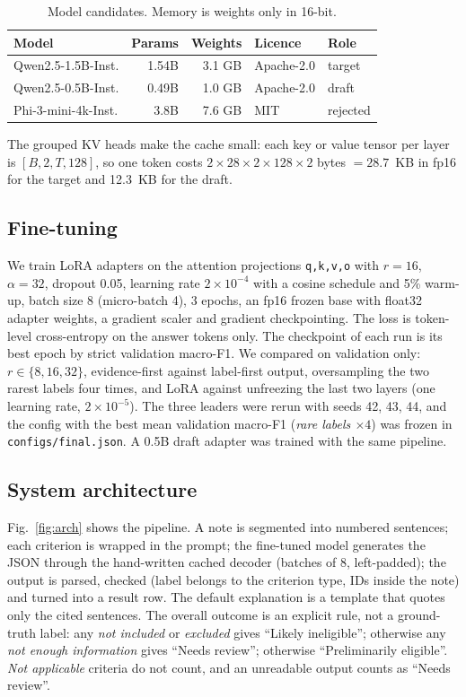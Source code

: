 \documentclass[conference]{IEEEtran}
\begin{document}
\begin{table}[t]
\centering\small
\caption{Model candidates. Memory is weights only in 16-bit.}
\label{tab:models}
\begin{tabular}{lrrll}
\toprule
Model & Params & Weights & Licence & Role \\
\midrule
Qwen2.5-1.5B-Inst. & 1.54B & 3.1 GB & Apache-2.0 & target \\
Qwen2.5-0.5B-Inst. & 0.49B & 1.0 GB & Apache-2.0 & draft \\
Phi-3-mini-4k-Inst. & 3.8B & 7.6 GB & MIT & rejected \\
\bottomrule
\end{tabular}
\end{table}

The grouped KV heads make the cache small: each key or value tensor per layer is $[B,2,T,128]$, so one token costs $2\times28\times2\times128\times2$ bytes $=28.7$~KB in fp16 for the target and 12.3~KB for the draft.

\subsection{Fine-tuning}
We train LoRA adapters on the attention projections \texttt{q,k,v,o} with $r=16$, $\alpha=32$, dropout 0.05, learning rate $2\times10^{-4}$ with a cosine schedule and 5\% warm-up, batch size 8 (micro-batch 4), 3 epochs, an fp16 frozen base with float32 adapter weights, a gradient scaler and gradient checkpointing. The loss is token-level cross-entropy on the answer tokens only. The checkpoint of each run is its best epoch by strict validation macro-F1. We compared on validation only: $r\in\{8,16,32\}$, evidence-first against label-first output, oversampling the two rarest labels four times, and LoRA against unfreezing the last two layers (one learning rate, $2\times10^{-5}$). The three leaders were rerun with seeds 42, 43, 44, and the config with the best mean validation macro-F1 (\emph{rare labels $\times4$}) was frozen in \texttt{configs/final.json}. A 0.5B draft adapter was trained with the same pipeline.

\subsection{System architecture}
Fig.~\ref{fig:arch} shows the pipeline. A note is segmented into numbered sentences; each criterion is wrapped in the prompt; the fine-tuned model generates the JSON through the hand-written cached decoder (batches of 8, left-padded); the output is parsed, checked (label belongs to the criterion type, IDs inside the note) and turned into a result row. The default explanation is a template that quotes only the cited sentences. The overall outcome is an explicit rule, not a ground-truth label: any \emph{not included} or \emph{excluded} gives ``Likely ineligible''; otherwise any \emph{not enough information} gives ``Needs review''; otherwise ``Preliminarily eligible''. \emph{Not applicable} criteria do not count, and an unreadable output counts as ``Needs review''.
\end{document}
